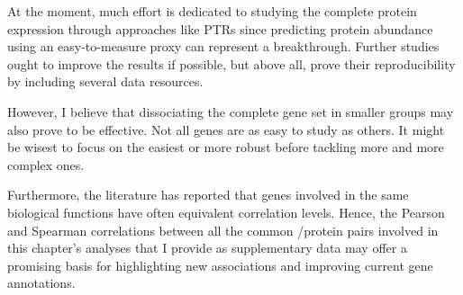At the moment, much effort is dedicated
to studying the complete protein expression through approaches like \glspl{PTR}
since predicting protein abundance using
an easy-to-measure proxy can represent a breakthrough.
Further studies ought to improve the results if possible,
but above all,
prove their reproducibility by including several data resources.

However, I believe that dissociating the complete gene set in smaller groups
may also prove to be effective.
Not all genes are as easy to study as others.
It might be wisest to focus on the easiest or more robust
before tackling more and more complex ones.

Furthermore, the literature has reported that
genes involved in the same biological functions
have often equivalent correlation levels.
Hence, the Pearson and Spearman correlations
between all the common \mRNA/protein pairs involved in this chapter's analyses
that I provide as supplementary data may offer a promising basis
for highlighting new associations and improving current gene annotations.

